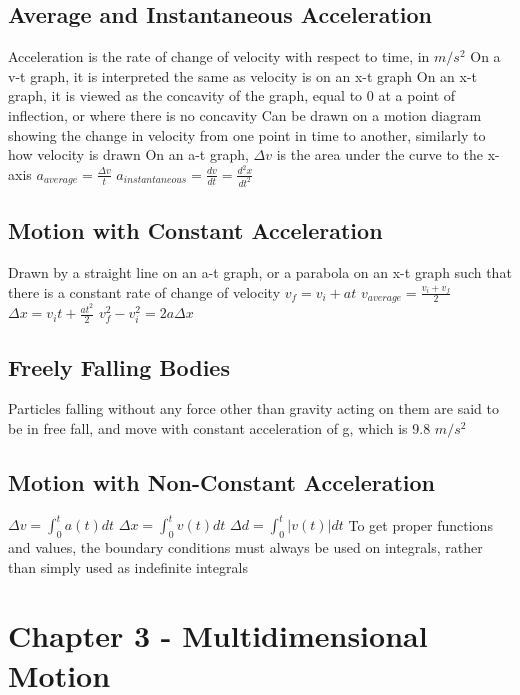 \documentclass[11 pt, twoside]{article}
\newenvironment{outline*}
{
	\begin{outline}[enumerate]
	}
	{\end{outline}
}
\begin{document}
\subsection{Average and Instantaneous Acceleration}
\begin{outline*}
\1 Acceleration is the rate of change of velocity with respect to time, in $m/s^2$
\2 On a v-t graph, it is interpreted the same as velocity is on an x-t graph
\2 On an x-t graph, it is viewed as the concavity of the graph, equal to 0 at a point of inflection, or where there is no concavity
\2 Can be drawn on a motion diagram showing the change in velocity from one point in time to another, similarly to how velocity is drawn
\2 On an a-t graph, $\Delta v$ is the area under the curve to the x-axis
\1 $a_{average} = \frac{\Delta v}{t}$
\1 $a_{instantaneous} = \frac{dv}{dt} = \frac{d^2x}{dt^2}$
\end{outline*}
\subsection{Motion with Constant Acceleration}
\begin{outline*}
\1 Drawn by a straight line on an a-t graph, or a parabola on an x-t graph such that there is a constant rate of change of velocity
\1 $v_f = v_i + at$
\1 $v_{average} = \frac{v_i + v_f}{2}$
\1 $\Delta x = v_it + \frac{at^2}{2}$
\1 $v_f^2 - v_i^2 = 2a\Delta x$
\end{outline*}
\subsection{Freely Falling Bodies}
\begin{outline*}
\1 Particles falling without any force other than gravity acting on them are said to be in free fall, and move with constant acceleration of g, which is 9.8 $m/s^2$
\end{outline*}
\subsection{Motion with Non-Constant Acceleration}
\begin{outline*}
\1 $\Delta v = \int_0^t a(t)dt$
\1 $\Delta x = \int_0^t v(t)dt$
\1 $\Delta d = \int_0^t |v(t)|dt$
\1 To get proper functions and values, the boundary conditions must always be used on integrals, rather than simply used as indefinite integrals
\end{outline*}
\section{Chapter 3 - Multidimensional Motion}
\end{document}
